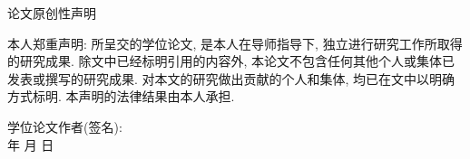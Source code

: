 \newpage
\vspace*{20pt}
\begin{center}{\heiti 论文原创性声明}\end{center}
\par\vspace*{30pt}
\renewcommand{\baselinestretch}{2}
{ \songti %



本人郑重声明: 所呈交的学位论文, 是本人在导师指导下, 独立进行研究工作所取得的研究成果.
除文中已经标明引用的内容外, 本论文不包含任何其他个人或集体已发表或撰写的研究成果.
对本文的研究做出贡献的个人和集体, 均已在文中以明确方式标明.
本声明的法律结果由本人承担. 

\vskip2cm

\hspace*{4cm}学位论文作者(签名): \hspace{4cm} \hfill \\[1cm]
\hspace*{10cm}年 \hfill  月 \hfill 日\hspace{1cm}\hfill\par}

  \iflib
  \else
  \newpage
  \cleardoublepage
  \fi
\renewcommand{\baselinestretch}{1.6}
\small\normalsize
